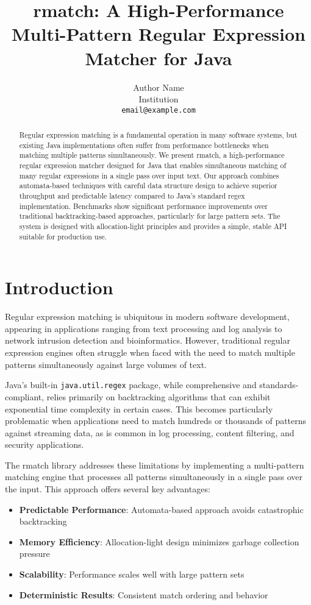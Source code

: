 \documentclass[twocolumn]{article}
\title{rmatch: A High-Performance Multi-Pattern Regular Expression Matcher for Java}
\author{Author Name\\
        Institution\\
        \texttt{email@example.com}}
\begin{document}
\maketitle

\begin{abstract}
Regular expression matching is a fundamental operation in many software systems, but existing Java implementations often suffer from performance bottlenecks when matching multiple patterns simultaneously. We present rmatch, a high-performance regular expression matcher designed for Java that enables simultaneous matching of many regular expressions in a single pass over input text. Our approach combines automata-based techniques with careful data structure design to achieve superior throughput and predictable latency compared to Java's standard regex implementation. Benchmarks show significant performance improvements over traditional backtracking-based approaches, particularly for large pattern sets. The system is designed with allocation-light principles and provides a simple, stable API suitable for production use.
\end{abstract}

\section{Introduction}

Regular expression matching is ubiquitous in modern software development, appearing in applications ranging from text processing and log analysis to network intrusion detection and bioinformatics. However, traditional regular expression engines often struggle when faced with the need to match multiple patterns simultaneously against large volumes of text.

Java's built-in \texttt{java.util.regex} package, while comprehensive and standards-compliant, relies primarily on backtracking algorithms that can exhibit exponential time complexity in certain cases. This becomes particularly problematic when applications need to match hundreds or thousands of patterns against streaming data, as is common in log processing, content filtering, and security applications.

The rmatch library addresses these limitations by implementing a multi-pattern matching engine that processes all patterns simultaneously in a single pass over the input. This approach offers several key advantages:

\begin{itemize}
\item \textbf{Predictable Performance}: Automata-based approach avoids catastrophic backtracking
\item \textbf{Memory Efficiency}: Allocation-light design minimizes garbage collection pressure
\item \textbf{Scalability}: Performance scales well with large pattern sets
\item \textbf{Deterministic Results}: Consistent match ordering and behavior
\end{itemize}
\end{document}
